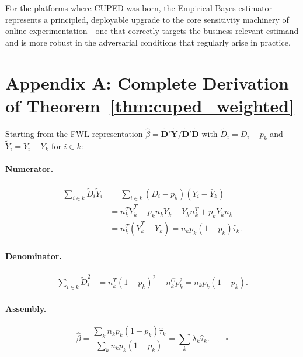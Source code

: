 \documentclass[12pt]{article}
\theoremstyle{plain}
\theoremstyle{definition}
\begin{document}
For the platforms where CUPED was born, the Empirical Bayes estimator
represents a principled, deployable upgrade to the core sensitivity machinery
of online experimentation---one that correctly targets the business-relevant
estimand and is more robust in the adversarial conditions that regularly
arise in practice.

\section*{Appendix A: Complete Derivation of Theorem~\ref{thm:cuped_weighted}}
\label{app:derivation}

Starting from the FWL representation $\hat{\beta} =
\tilde{\mathbf{D}}'\tilde{\mathbf{Y}} / \tilde{\mathbf{D}}'\tilde{\mathbf{D}}$
with $\tilde{D}_i = D_i - p_k$ and $\tilde{Y}_i = Y_i - \bar{Y}_k$ for
$i \in k$:

\paragraph{Numerator.}
\begin{align}
  \sum_{i \in k} \tilde{D}_i\tilde{Y}_i
    &= \sum_{i \in k} (D_i - p_k)(Y_i - \bar{Y}_k) \\
    &= n_k^T\bar{Y}_k^T - p_k n_k \bar{Y}_k
       - \bar{Y}_k n_k^T + p_k \bar{Y}_k n_k \\
    &= n_k^T(\bar{Y}_k^T - \bar{Y}_k)
     = n_k p_k (1-p_k) \hat{\tau}_k.
\end{align}

\paragraph{Denominator.}
\begin{align}
  \sum_{i \in k} \tilde{D}_i^2
    &= n_k^T(1-p_k)^2 + n_k^C p_k^2
     = n_k p_k(1-p_k).
\end{align}

\paragraph{Assembly.}
\begin{equation}
  \hat{\beta} = \frac{\sum_k n_k p_k(1-p_k)\hat{\tau}_k}
                     {\sum_k n_k p_k(1-p_k)}
             = \sum_k \lambda_k \hat{\tau}_k.
  \qquad \square
\end{equation}

\end{document}

